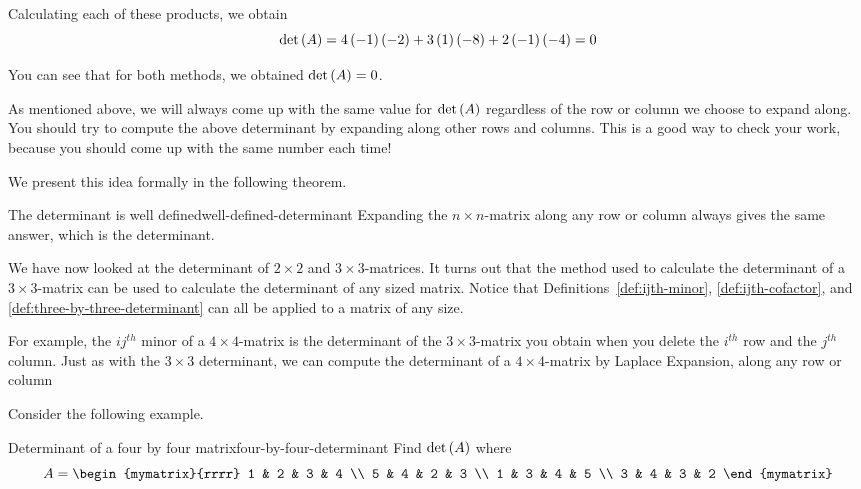 \begin{solution}
Calculating each of these products, we obtain
\begin{equation*}
\det \left(A\right)
=
4\left(-1\right)\left(-2\right) 
+
3\left(1\right)\left(-8\right) 
+
2 \left(-1\right)\left(-4\right)
=
0
\end{equation*}

You can see that for both methods, we obtained $\det \left(A\right) = 0$. 
\end{solution}

As mentioned above, we will always come up with the same value for $\det \left(A\right)$ regardless of the row or column 
we choose to expand along. You should try to compute the above determinant by expanding along other
rows and columns. This is a good way to check your work, because you should come up 
with the same number each time!  

We present this idea formally in the following theorem.

\begin{theorem}{The determinant is well defined}{well-defined-determinant}
Expanding the $n\times n$-matrix along any row or column always gives the
same answer, which is the determinant.
\end{theorem}

We have now looked at the determinant of $2 \times 2$ and $3 \times 3$-matrices. It turns
out that the method used to calculate the determinant of a $3 \times 3$-matrix 
can be used to calculate the determinant of any sized matrix. Notice that
Definitions~\ref{def:ijth-minor}, {\ref{def:ijth-cofactor}}, and {\ref{def:three-by-three-determinant}}
can all be applied to a matrix of any size. 

For example, the $ij^{th}$ minor of a $4 \times 4$-matrix is the determinant
of the $3 \times 3$-matrix you obtain when you delete the $i^{th}$ row and the $j^{th}$ column. 
Just as with the $3 \times 3$ determinant, we can compute the determinant of a $4 \times 4$-matrix by Laplace Expansion, 
along any row or column

Consider the following example. 

\begin{example}{Determinant of a four by four matrix}{four-by-four-determinant}
Find $\det \left(A\right) $ where
\begin{equation*}
A=\begin{mymatrix}{rrrr}
1 & 2 & 3 & 4 \\
5 & 4 & 2 & 3 \\
1 & 3 & 4 & 5 \\
3 & 4 & 3 & 2
\end{mymatrix}
\end{equation*}
\end{example}

